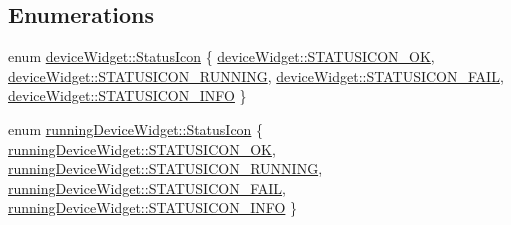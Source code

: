 \subsection*{\-Enumerations}
\begin{DoxyCompactItemize}
\item 
enum \hyperlink{group___y_modem_uploader_ga788236c4f7d8fe7586489a183528d657}{device\-Widget\-::\-Status\-Icon} \{ \hyperlink{group___y_modem_uploader_gga788236c4f7d8fe7586489a183528d657a8bca9ffd7e0d28d471e8b3f6aa52120c}{device\-Widget\-::\-S\-T\-A\-T\-U\-S\-I\-C\-O\-N\-\_\-\-O\-K}, 
\hyperlink{group___y_modem_uploader_gga788236c4f7d8fe7586489a183528d657a9930ae1923857bf1f78907ee4bb3baaa}{device\-Widget\-::\-S\-T\-A\-T\-U\-S\-I\-C\-O\-N\-\_\-\-R\-U\-N\-N\-I\-N\-G}, 
\hyperlink{group___y_modem_uploader_gga788236c4f7d8fe7586489a183528d657a72975044b2bc8aa1b97b1bd730059025}{device\-Widget\-::\-S\-T\-A\-T\-U\-S\-I\-C\-O\-N\-\_\-\-F\-A\-I\-L}, 
\hyperlink{group___y_modem_uploader_gga788236c4f7d8fe7586489a183528d657a7e4049feafb5e7f932619e41afda5257}{device\-Widget\-::\-S\-T\-A\-T\-U\-S\-I\-C\-O\-N\-\_\-\-I\-N\-F\-O}
 \}
\item 
enum \hyperlink{group___y_modem_uploader_ga2544534d93816d92882b9351db3e3832}{running\-Device\-Widget\-::\-Status\-Icon} \{ \hyperlink{group___y_modem_uploader_gga2544534d93816d92882b9351db3e3832a9ee79f7fd0f08c1c300815f7dda5f034}{running\-Device\-Widget\-::\-S\-T\-A\-T\-U\-S\-I\-C\-O\-N\-\_\-\-O\-K}, 
\hyperlink{group___y_modem_uploader_gga2544534d93816d92882b9351db3e3832a2dfa2228c471d23502656be472cfea8a}{running\-Device\-Widget\-::\-S\-T\-A\-T\-U\-S\-I\-C\-O\-N\-\_\-\-R\-U\-N\-N\-I\-N\-G}, 
\hyperlink{group___y_modem_uploader_gga2544534d93816d92882b9351db3e3832acbb5494d2fd96bb7d0b706e0125e0089}{running\-Device\-Widget\-::\-S\-T\-A\-T\-U\-S\-I\-C\-O\-N\-\_\-\-F\-A\-I\-L}, 
\hyperlink{group___y_modem_uploader_gga2544534d93816d92882b9351db3e3832acfa9666424709e360d9f9e7d9af00ab4}{running\-Device\-Widget\-::\-S\-T\-A\-T\-U\-S\-I\-C\-O\-N\-\_\-\-I\-N\-F\-O}
 \}
\end{DoxyCompactItemize}
